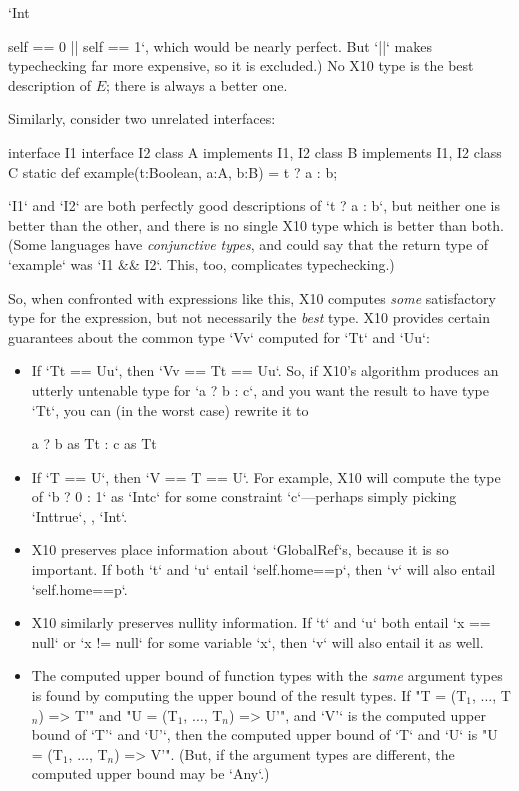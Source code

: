 \xcd`Int{self == 0 || self == 1`, which would be nearly perfect.  But 
\xcd`||` makes typechecking far more expensive, so it is excluded.)
No X10 type is the best description of {$E$}; there is always a better one.

Similarly, consider two unrelated interfaces: 
\begin{xten}
interface I1 {}
interface I2 {}
class A implements I1, I2 {}
class B implements I1, I2 {}
class C {
  static def example(t:Boolean, a:A, b:B) = t ? a : b;
}
\end{xten}
%
\xcd`I1` and \xcd`I2` are both perfectly good descriptions of \xcd`t ? a : b`, 
but neither one is better than the other, and there is no single X10 type
which is better than both. (Some languages have {\em conjunctive
    types}, and could say that the return type of \xcd`example` was 
\xcd`I1 && I2`.  This, too, complicates typechecking.)


So, when confronted with expressions like this, X10 computes {\em some}
satisfactory type for the expression, but not necessarily the {\em best} type.  
X10 provides certain guarantees about the common type \xcd`V{v}` computed for 
\xcd`T{t}` and \xcd`U{u}`: 
\begin{itemize}
\item If \xcd`T{t} == U{u}`, then \xcd`V{v} == T{t} == U{u}`.  So, if X10's
      algorithm produces an utterly untenable type for \xcd`a ? b : c`, and
      you want the result to have type \xcd`T{t}`, you can 
      (in the worst case) rewrite it to 
\begin{xtenmath}
a ? b as T{t} : c as T{t}
\end{xtenmath}
\item If \xcd`T == U`, then \xcd`V == T == U`.  For example, 
      X10 will compute the type of \xcd`b ? 0 : 1` as 
      \xcd`Int{c}` for some constraint \xcd`c`---perhaps simply 
      picking \xcd`Int{true}`, \viz, \xcd`Int`. 
\item X10 preserves place information about \xcd`GlobalRef`s, because it is so important. If both
      \xcd`t` and \xcd`u` entail \xcd`self.home==p`, then  
      \xcd`v` will also entail \xcd`self.home==p`.  
\item X10 similarly preserves nullity information.  If \xcd`t` and \xcd`u`
      both entail \xcd`x == null` or \xcd`x != null` for some variable
      \xcd`x`, then \xcd`v` will also entail it as well.

\item The computed upper bound of function types with the {\em same} argument
      types is found by computing the upper bound of the result types.  
      If 
      \xcdmath"T = (T$_1$, $\ldots$, T$_n$) => T'"
      and 
      \xcdmath"U = (T$_1$, $\ldots$, T$_n$) => U'", 
      and \xcd`V'` is the computed upper bound of \xcd`T'` and \xcd`U'`, 
      then the computed upper bound of \xcd`T` and \xcd`U` is 
      \xcdmath"U = (T$_1$, $\ldots$, T$_n$) => V'".
      (But, if the argument types are different, the computed upper bound may
      be \xcd`Any`.)


\end{itemize}}
